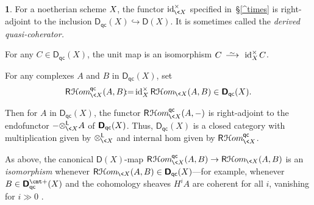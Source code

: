 \documentclass{compositio}
\theoremstyle{plain}
\theoremstyle{definition}
\newtheorem{cosa}[thm]{}
\theoremstyle{remark}
\numberwithin{equation}{thm}
\begin{document}
\begin{cosa}\label{RHom^qc} 
For a noetherian scheme $X{\mkern-1mu}$, the functor
$\operatorname{id}_{{{\mkern-1mu}\<X}}^\times$ specified in~\S\ref{^times} is right-adjoint to the inclusion
${{\boldsymbol{\mathsf{D}}}_{\mathsf{qc}}}(X)\hookrightarrow{\boldsymbol{\mathsf{D}}}(X)$. It is sometimes called the \emph{derived quasi-coherator.} 

For any $C\in{{\boldsymbol{\mathsf{D}}}_{\mathsf{qc}}}(X)$, the unit map is an isomorphism $C{{\mkern8mu\longrightarrow \mkern-25.5mu{}^\sim\mkern17mu}} \operatorname{id}_X^\times{\mkern-1mu} C$.

For any complexes $A$ and $B$ in ${{\boldsymbol{\mathsf{D}}}_{\mathsf{qc}}}(X)$, set
\begin{equation}\label{RHqc}
{{\mathsf R}{\mkern1mu}{{\mathcal H} om}_{{{\mkern-1mu}\<X}}^{{\mkern-1mu}{\mathsf{qc}}}}(A,B){\!:=} \operatorname{id}_X^\times{\mathsf R}{{\mathcal H} om}_{{{\mkern-1mu}\<X}}(A,B)\in{{\boldsymbol{\mathsf{D}}}_{\mathsf{qc}}}(X).
\end{equation}

Then for $A$  in ${{\boldsymbol{\mathsf{D}}}_{\mathsf{qc}}}(X)$, 
the functor ${{\mathsf R}{\mkern1mu}{{\mathcal H} om}_{{{\mkern-1mu}\<X}}^{{\mkern-1mu}{\mathsf{qc}}}}(A,-)$ is right-adjoint to the endofunctor 
$-{\otimes^{\mathsf L}_{{{\mkern-1mu}\<X}}} A$ of ${\mkern1mu}{{\boldsymbol{\mathsf{D}}}_{\mathsf{qc}}}(X)$. 
Thus, ${{\boldsymbol{\mathsf{D}}}_{\mathsf{qc}}}(X)$ is a closed category with multiplication given by ${\otimes^{\mathsf L}_{{{\mkern-1mu}\<X}}}$ and internal hom given by 
${{\mathsf R}{\mkern1mu}{{\mathcal H} om}_{{{\mkern-1mu}\<X}}^{{\mkern-1mu}{\mathsf{qc}}}}$.

As above, the canonical ${\boldsymbol{\mathsf{D}}}(X)$-map ${{\mathsf R}{\mkern1mu}{{\mathcal H} om}_{{{\mkern-1mu}\<X}}^{{\mkern-1mu}{\mathsf{qc}}}}(A,B)\to{\mathsf R}{{\mathcal H} om}_{{{\mkern-1mu}\<X}}(A,B)$
is an \emph{isomorphism} whenever ${\mathsf R}{{\mathcal H} om}_{{{\mkern-1mu}\<X}}(A,B)\in{{\boldsymbol{\mathsf{D}}}_{\mathsf{qc}}}(X)$---for example, whenever $B\in{{\boldsymbol{\mathsf{D}}}_{\mathsf{qc}}^{{\vbox to 0pt{\vskip-.95 ex\hbox{$\scriptstyle \text{\cmt\char'053}$}\vss}}}}(X)$ and the cohomology sheaves $H^iA$ are coherent for all $i$, vanishing for $i\gg 0$ \cite[p.\,92, 3.3]{RD}.
\end{cosa}
\end{document}
